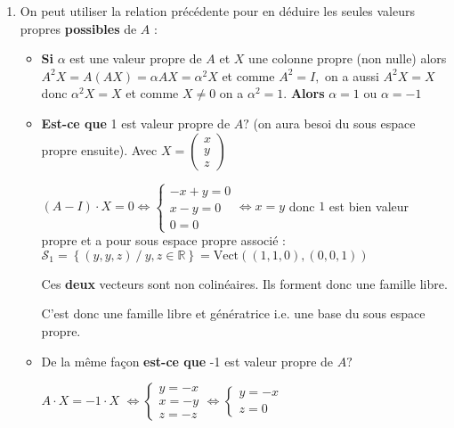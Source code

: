 \begin{correction}
\begin{enumerate}
\begin{enumerate}
\item On peut utiliser la relation pr\'{e}c\'{e}dente pour en d\'{e}duire
les seules valeurs propres \textbf{possibles} de $A$ :

\begin{itemize}
\item \textbf{Si }$\alpha $ est une valeur propre de $A$ et $X$ une colonne
propre (non nulle) alors $A^{2}X=A\left( AX\right) =\alpha AX=\alpha ^{2}X$
et comme $A^{2}=I,$ on a aussi $A^{2}X=X$ donc $\alpha ^{2}X=X$ et comme $%
X\neq 0$ on a $\alpha ^{2}=1.$ \textbf{Alors }$\alpha =1$ ou $\alpha =-1$

\item \textbf{Est-ce que }1 est valeur propre de $A?$ (on aura besoi du sous
espace propre ensuite). Avec $X=\left( 
\begin{array}{c}
x \\ 
y \\ 
z%
\end{array}%
\right) $

$\left( A-I\right) \cdot X=0\Longleftrightarrow \left\{ 
\begin{array}{c}
-x+y=0 \\ 
x-y=0 \\ 
0=0%
\end{array}%
\right. \Leftrightarrow x=y$ donc $1$ est bien valeur propre et a pour sous
espace propre associ\'{e} : \newline
$\mathcal{S}_{1}=\left\{ \left( y,y,z\right) \ /\ y,z\in \mathbb{R}\right\} =%
\mathrm{Vect}\left( \left( 1,1,0\right) ,\left( 0,0,1\right) \right) $

Ces \textbf{deux }vecteurs sont non colin\'{e}aires. Ils forment donc une
famille libre.

C'est donc une famille libre et g\'{e}n\'{e}ratrice i.e. une base du sous
espace propre.

\item De la m\^{e}me fa\c{c}on \textbf{est-ce que }-1 est valeur propre de $%
A?$

$A\cdot X=-1\cdot X$ $\Leftrightarrow \left\{ 
\begin{array}{c}
y=-x \\ 
x=-y \\ 
z=-z%
\end{array}%
\right. \Leftrightarrow \left\{ 
\begin{array}{c}
y=-x \\ 
z=0%
\end{array}%
\right. $


\end{itemize}
\end{enumerate}
\end{enumerate}
\end{correction}
